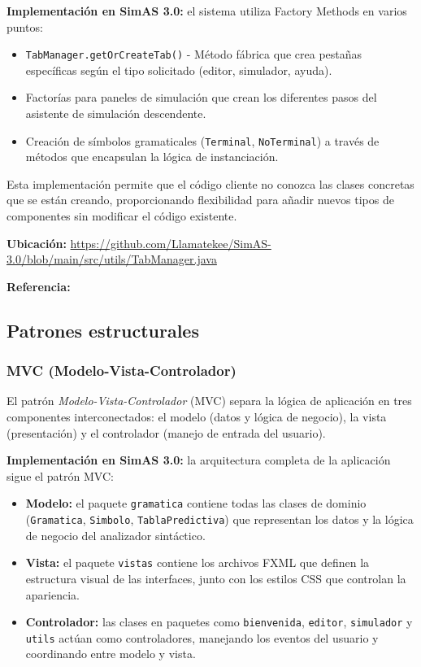 \textbf{Implementación en SimAS 3.0:} el sistema utiliza Factory Methods en varios puntos:

\begin{itemize}
    \item \texttt{TabManager.getOrCreateTab()} - Método fábrica que crea pestañas específicas según el tipo solicitado (editor, simulador, ayuda).
    \item Factorías para paneles de simulación que crean los diferentes pasos del asistente de simulación descendente.
    \item Creación de símbolos gramaticales (\texttt{Terminal}, \texttt{NoTerminal}) a través de métodos que encapsulan la lógica de instanciación.
\end{itemize}

Esta implementación permite que el código cliente no conozca las clases concretas que se están creando, proporcionando flexibilidad para añadir nuevos tipos de componentes sin modificar el código existente.

\textbf{Ubicación:} \url{https://github.com/Llamatekee/SimAS-3.0/blob/main/src/utils/TabManager.java}

\textbf{Referencia:} \cite[pp. 107-116]{gamma1994design}

\subsection{Patrones estructurales}

\subsubsection{MVC (Modelo-Vista-Controlador)}

El patrón \textit{Modelo-Vista-Controlador} (MVC) separa la lógica de aplicación en tres componentes interconectados: el modelo (datos y lógica de negocio), la vista (presentación) y el controlador (manejo de entrada del usuario).

\textbf{Implementación en SimAS 3.0:} la arquitectura completa de la aplicación sigue el patrón MVC:

\begin{itemize}
    \item \textbf{Modelo:} el paquete \texttt{gramatica} contiene todas las clases de dominio (\texttt{Gramatica}, \texttt{Simbolo}, \texttt{TablaPredictiva}) que representan los datos y la lógica de negocio del analizador sintáctico.
    \item \textbf{Vista:} el paquete \texttt{vistas} contiene los archivos FXML que definen la estructura visual de las interfaces, junto con los estilos CSS que controlan la apariencia.
    \item \textbf{Controlador:} las clases en paquetes como \texttt{bienvenida}, \texttt{editor}, \texttt{simulador} y \texttt{utils} actúan como controladores, manejando los eventos del usuario y coordinando entre modelo y vista.
\end{itemize}

